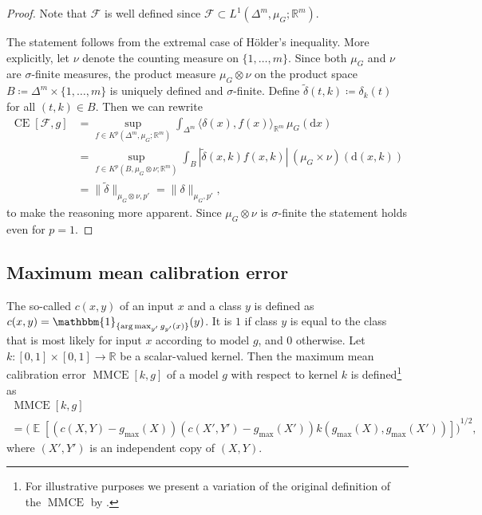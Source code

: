 \documentclass{article}
\DeclareMathOperator{\Expect}{\mathbb{E}}
\DeclareMathOperator*{\argmax}{arg\,max}
\DeclareMathOperator{\measure}{CE}
\DeclareMathOperator{\MMCE}{MMCE}
\begin{document}
\begin{proof}
  Note that $\mathcal{F}$ is well defined since
  $\mathcal{F} \subset L^1(\Delta^m, \mu_G; \mathbb{R}^m)$.

  The statement follows from the extremal case of Hölder's inequality. More
  explicitly, let $\nu$ denote the counting measure on $\{1,\ldots,m\}$. Since
  both $\mu_G$ and $\nu$ are $\sigma$-finite measures, the product measure
  $\mu_G \otimes \nu$ on the product space
  $B \coloneqq \Delta^m \times \{1,\ldots,m\}$ is uniquely defined and
  $\sigma$-finite. Define
  $\tilde{\delta}(t, k) \coloneqq \delta_k(t)$ for all $(t,k) \in B$. Then we
  can rewrite
  \begin{equation*}
    \begin{split}
      \measure[\mathcal{F}, g] &= \sup_{f \in K^p(\Delta^m, \mu_G; \mathbb{R}^m)} \int_{\Delta^m} \langle \delta(x), f(x) \rangle_{\mathbb{R}^m} \, \mu_G(\mathrm{d}x) \\
      &= \sup_{f \in K^p(B, \mu_G \otimes \nu; \mathbb{R}^m)} \int_B | \tilde{\delta}(x, k) f(x, k) | \, (\mu_G \times \nu)(\mathrm{d}(x, k)) \\
      &= \|\tilde{\delta}\|_{\mu_G \otimes \nu, p'} = \|\delta\|_{\mu_G, p'},
    \end{split}
  \end{equation*}
  to make the reasoning more apparent. Since $\mu_G \otimes \nu$ is
  $\sigma$-finite the statement holds even for $p = 1$.
\end{proof}

\subsection{Maximum mean calibration error}

The so-called
$c(x, y)$ of an input $x$ and a class $y$ is defined as
$c(x, y) = \mathbbm{1}_{\{\argmax_{y'} g_{y'}(x)\}}(y)$. It is $1$ if class $y$
is equal to the class that is most likely for input $x$
according to model $g$, and $0$ otherwise. Let
$k \colon [0,1] \times [0,1] \to \mathbb{R}$ be a scalar-valued kernel. Then the
maximum mean calibration error $\MMCE[k,g]$ of a model $g$ with respect to
kernel $k$ is defined\footnote{For illustrative purposes we present a variation
  of the original definition of the $\MMCE$ by
  \citet{kumar18_train_calib_measur_neural_networ}.} as
\begin{multline*}
  \MMCE[k, g] \\
  = {\bigg(\Expect[(c(X, Y) - g_{\max}(X))(c(X',Y') - g_{\max}(X')) k(g_{\max}(X), g_{\max}(X'))]\bigg)}^{1/2},
\end{multline*}
where $(X',Y')$ is an independent copy of $(X,Y)$.
\end{document}
